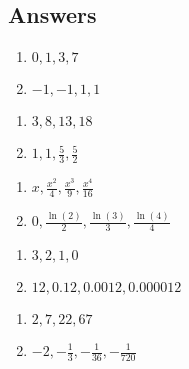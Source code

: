 \documentclass{ximera}
\begin{document}
\newpage

\subsection{Answers}

\begin{multicols}{2}
\begin{enumerate}

\item $0, 1, 3, 7$
\item $-1, -1, 1, 1$

\setcounter{HW}{\value{enumi}}
\end{enumerate}
\end{multicols}

\begin{multicols}{2}
\begin{enumerate}
\setcounter{enumi}{\value{HW}}

\item $3, 8, 13, 18$
\item $1, 1, \frac{5}{3}, \frac{5}{2}$

\setcounter{HW}{\value{enumi}}
\end{enumerate}
\end{multicols}

\begin{multicols}{2}
\begin{enumerate}
\setcounter{enumi}{\value{HW}}

\item $x, \frac{x^{2}}{4}, \frac{x^{3}}{9}, \frac{x^{4}}{16}$
\item $0, \frac{\ln(2)}{2}, \frac{\ln(3)}{3}, \frac{\ln(4)}{4}$

\setcounter{HW}{\value{enumi}}
\end{enumerate}
\end{multicols}

\begin{multicols}{2}
\begin{enumerate}
\setcounter{enumi}{\value{HW}}

\item $3, 2, 1, 0$
\item $12, 0.12, 0.0012, 0.000012$

\setcounter{HW}{\value{enumi}}
\end{enumerate}
\end{multicols}

\begin{multicols}{2}
\begin{enumerate}
\setcounter{enumi}{\value{HW}}

\item $2, 7, 22, 67$
\item $-2, -\frac{1}{3}, -\frac{1}{36}, -\frac{1}{720}$

\setcounter{HW}{\value{enumi}}
\end{enumerate}
\end{multicols}
\end{document}
